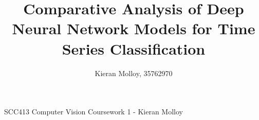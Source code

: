 \documentclass[journal]{IEEEtran}
\begin{document}
%
\title{Comparative Analysis of Deep Neural Network Models for Time Series Classification}
%
%
%

\author{Kieran Molloy, 35762970}

% 
%



%
{SCC413 Computer Vision Coursework 1 - Kieran Molloy}
% 
\end{document}
